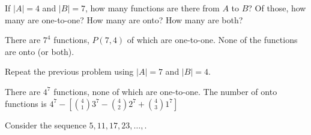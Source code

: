 \begin{squestions}
\question If $|A| = 4$ and $|B| = 7$, how many functions are there from $A$ to $B$?  Of those, how many are one-to-one?  How many are onto?  How many are both? 

  \begin{answer}
	 There are $7^4$ functions, $P(7,4)$ of which are one-to-one.  None of the functions are onto (or both).
  \end{answer}


\question Repeat the previous problem using $|A| = 7$ and $|B| = 4$.

  \begin{answer}
	 There are $4^7$ functions, none of which are one-to-one.  The number of onto functions is $4^7 - \left[{4 \choose 1}3^7 - {4 \choose 2}2^7 + {4 \choose 3}1^7\right]$
  \end{answer}



\question Consider the sequence $5, 11, 17, 23, \ldots, $. 


\end{squestions}

